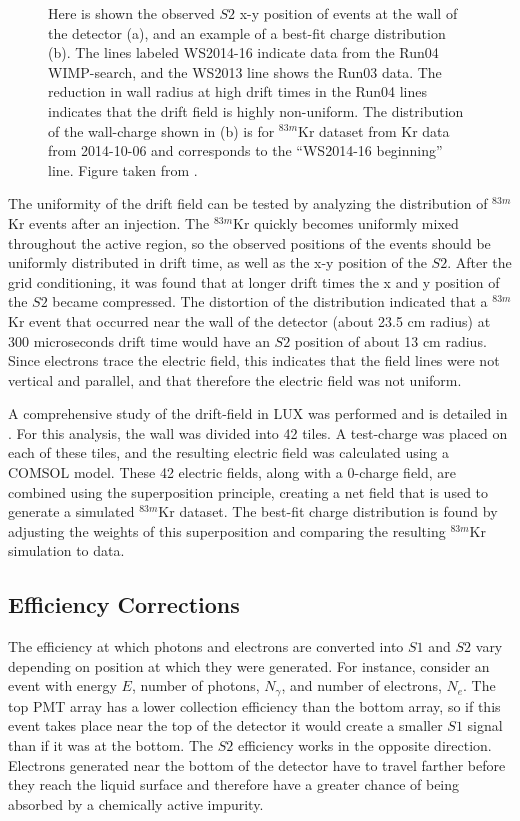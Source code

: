\begin{figure}[!h]
\begin{subfigure}{0.5\linewidth}
\caption{}
\end{subfigure}
\caption{Here is shown the observed $S2$ x-y position of events at the wall of the detector (a), and an example of a best-fit charge distribution (b). The lines labeled WS2014-16 indicate data from the Run04 WIMP-search, and the WS2013 line shows the Run03 data. The reduction in wall radius at high drift times in the Run04 lines indicates that the drift field is highly non-uniform. The distribution of the wall-charge shown in (b) is for $^{83m}$Kr dataset from Kr data from 2014-10-06 and corresponds to the ``WS2014-16 beginning'' line. Figure taken from \cite{lux_efield}.}
\label{fig:lux_layout} 
\end{figure}

The uniformity of the drift field can be tested by analyzing the distribution of $^{83m}$Kr events after an injection. The $^{83m}$Kr quickly becomes uniformly mixed throughout the active region, so the observed positions of the events should be uniformly distributed in drift time, as well as the x-y position of the $S2$. After the grid conditioning, it was found that at longer drift times the x and y position of the $S2$ became compressed. The distortion of the distribution indicated that a $^{83m}$Kr event that occurred near the wall of the detector (about 23.5 cm radius) at 300 microseconds drift time would have an $S2$ position of about 13 cm radius. Since electrons trace the electric field, this indicates that the field lines were not vertical and parallel, and that therefore the electric field was not uniform.

A comprehensive study of the drift-field in LUX was performed and is detailed in \cite{lux_efield}. For this analysis, the wall was divided into 42 tiles. A test-charge was placed on each of these tiles, and the resulting electric field was calculated using a COMSOL model. These 42 electric fields, along with a 0-charge field, are combined using the superposition principle, creating a net field that is used to generate a simulated $^{83m}$Kr dataset. The best-fit charge distribution is found by adjusting the weights of this superposition and comparing the resulting $^{83m}$Kr simulation to data.
 
 \subsection{Efficiency Corrections}\label{sec:krypcal}
The efficiency at which photons and electrons are converted into $S1$ and $S2$ vary depending on position at which they were generated. For instance, consider an event with energy $E$, number of photons, $N_{\gamma}$, and number of electrons, $N_e$. The top PMT array has a lower collection efficiency than the bottom array, so if this event takes place near the top of the detector it would create a smaller $S1$ signal than if it was at the bottom. The $S2$ efficiency works in the opposite direction. Electrons generated near the bottom of the detector have to travel farther before they reach the liquid surface and therefore have a greater chance of being absorbed by a chemically active impurity. 

